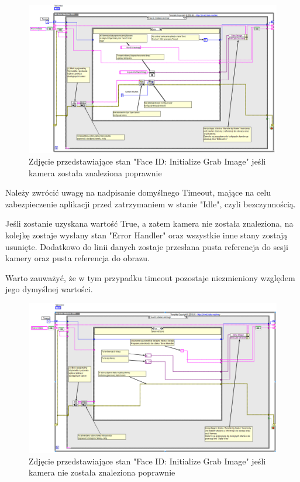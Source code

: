 \documentclass{report}
\begin{document}
\begin{figure}[H]
    \centering
    \includegraphics[width=1.0\textwidth]{src/face-id/face-id-init.png}
    \caption{Zdjęcie przedstawiające stan "Face ID: Initialize Grab Image" jeśli kamera została znaleziona poprawnie}
    \label{fig:face_id-init_false}
\end{figure}

Należy zwrócić uwagę na nadpisanie domyślnego Timeout, mające na celu zabezpieczenie aplikacji przed zatrzymaniem w stanie "Idle", czyli bezczynnością.

Jeśli zostanie uzyskana wartość True, a zatem kamera nie została znaleziona, na kolejkę zostaje wysłany stan "Error Handler" oraz wszystkie inne stany zostają usunięte. 
Dodatkowo do linii danych zostaje przesłana pusta referencja do sesji kamery oraz pusta referencja do obrazu. 

Warto zauważyć, że w tym przypadku timeout pozostaje niezmieniony względem jego dymyślnej wartości. 

\begin{figure}[H]
    \centering
    \includegraphics[width=1.0\textwidth]{src/face-id/face-id-init-T.png}
    \caption{Zdjęcie przedstawiające stan "Face ID: Initialize Grab Image" jeśli kamera nie została znaleziona poprawnie}
    \label{fig:face_id-init_true}
\end{figure}
\end{document}
